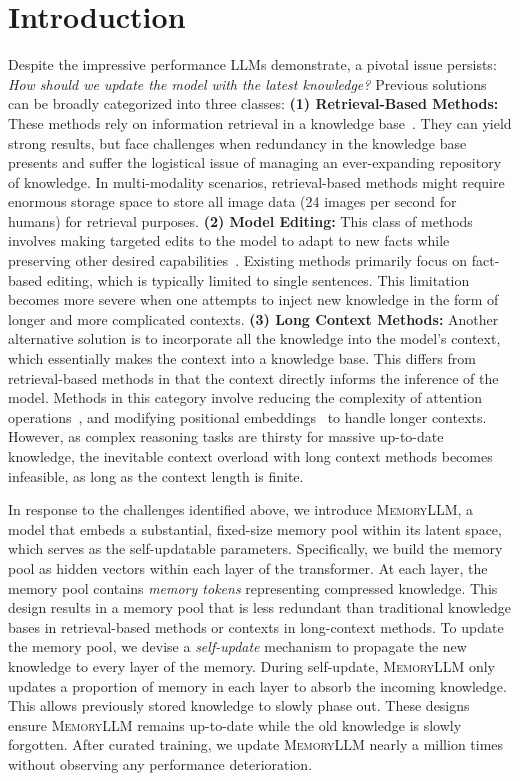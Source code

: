 \documentclass{article}
\theoremstyle{plain}
\theoremstyle{definition}
\theoremstyle{remark}
\newcommand{\ours}{\textsc{MemoryLLM}\xspace}
\begin{document}
\section{Introduction}
\label{sec:introduction}
Despite the impressive performance LLMs demonstrate, a pivotal issue persists: \emph{How should we update the model with the latest knowledge?} Previous solutions can be broadly categorized into three classes: 
\textbf{(1) Retrieval-Based Methods:} These methods rely on information retrieval in a knowledge base~\citep{kNNLM,MemoryBank}. They can yield strong results, but face challenges when redundancy in the knowledge base presents and suffer the logistical issue of managing an ever-expanding repository of knowledge. 
In multi-modality scenarios, retrieval-based methods might require enormous storage space to store all image data (24 images per second for humans) for retrieval purposes. 
\textbf{(2) Model Editing:} This class of methods involves making targeted edits to the model to adapt to new facts while preserving other desired capabilities~\citep{LLMEditing}. Existing methods primarily focus on fact-based editing, which is typically limited to single sentences. 
This limitation becomes more severe when one attempts to inject new knowledge in the form of longer and more complicated contexts. 
\textbf{(3) Long Context Methods:} Another alternative solution is to incorporate all the knowledge into the model's context,  
which essentially makes the context into a knowledge base. 
This differs from retrieval-based methods in that the context directly informs the inference of the model. Methods in this category involve reducing the complexity of attention operations~\citep{SparserTransformer, longformer, linformer}, and modifying positional embeddings~\citep{alibi, lextransformer} to handle longer contexts. However, as complex reasoning tasks are thirsty for massive up-to-date knowledge, the inevitable context overload with long context methods becomes infeasible, as long as the context length is finite.


In response to the challenges identified above, we introduce \ours, a model that embeds a substantial, fixed-size memory pool within its latent space, which serves as the self-updatable parameters.
Specifically, we build the memory pool as hidden vectors within each 
layer of the transformer. 
At each layer, the memory pool contains \textit{memory tokens} representing compressed knowledge.
This design results in a memory pool that is less redundant than traditional knowledge bases in retrieval-based methods or contexts in long-context methods.
To update the memory pool, we devise a \textit{self-update} mechanism to propagate the new knowledge to every layer of the memory. During self-update, 
\ours only updates a proportion of memory in each layer to absorb the incoming knowledge. This allows previously stored knowledge to slowly phase out. 
These designs ensure \ours remains up-to-date while the old knowledge is slowly forgotten. 
After curated training, we update \ours nearly a million times without observing any performance deterioration.
\end{document}
